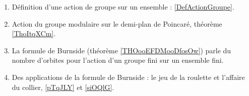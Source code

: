     \label{THEMEooKZHBooRCULcr}
    \begin{enumerate}
        \item Définition d'une action de groupe sur un ensemble : \ref{DefActionGroupe}.
    \item Action du groupe modulaire sur le demi-plan de Poincaré, théorème \ref{ThoItqXCm}. 
    \item
        La formule de Burnside (théorème \ref{THOooEFDMooDfosOw}) parle du nombre d'orbites pour l'action d'un groupe fini sur un ensemble fini.
    \item Des applications de la formule de Burnside : le jeu de la roulette et l'affaire du collier, \ref{pTqJLY} et \ref{siOQlG}.

    \end{enumerate}


